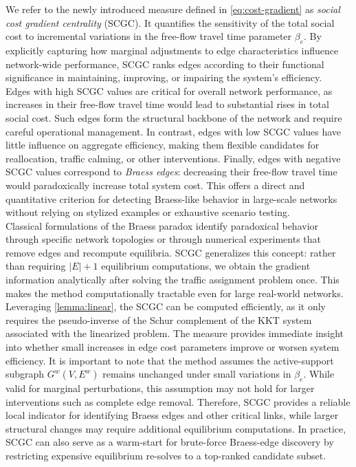 \documentclass[twocolumn,english,groupedaddress, superscriptaddress,aps,pre,10pt,floatfix]{revtex4-2}
\begin{document}
We refer to the newly introduced measure defined in \cref{eq:cost-gradient} as \textit{social cost gradient centrality} (SCGC). It quantifies the sensitivity of the total social cost to incremental variations in the free-flow travel time parameter $\beta_e$. By explicitly capturing how marginal adjustments to edge characteristics influence network-wide performance, SCGC ranks edges according to their functional significance in maintaining, improving, or impairing the system’s efficiency.\\

Edges with high SCGC values are critical for overall network performance, as increases in their free-flow travel time would lead to substantial rises in total social cost. Such edges form the structural backbone of the network and require careful operational management. In contrast, edges with low SCGC values have little influence on aggregate efficiency, making them flexible candidates for reallocation, traffic calming, or other interventions. Finally, edges with negative SCGC values correspond to \textit{Braess edges}: decreasing their free-flow travel time would paradoxically increase total system cost. This offers a direct and quantitative criterion for detecting Braess-like behavior in large-scale networks without relying on stylized examples or exhaustive scenario testing.\\

Classical formulations of the Braess paradox \cite{braess1968paradoxon} identify paradoxical behavior through specific network topologies or through numerical experiments that remove edges and recompute equilibria. SCGC generalizes this concept: rather than requiring $|E|+1$ equilibrium computations, we obtain the gradient information analytically after solving the traffic assignment problem once. This makes the method computationally tractable even for large real-world networks.\\

Leveraging \cref{lemma:linear}, the SCGC can be computed efficiently, as it only requires the pseudo-inverse of the Schur complement of the KKT system associated with the linearized problem. The measure provides immediate insight into whether small increases in edge cost parameters improve or worsen system efficiency. It is important to note that the method assumes the active-support subgraph $G^w(V,E^w)$ remains unchanged under small variations in $\beta_e$. While valid for marginal perturbations, this assumption may not hold for larger interventions such as complete edge removal. Therefore, SCGC provides a reliable local indicator for identifying Braess edges and other critical links, while larger structural changes may require additional equilibrium computations. In practice, SCGC can also serve as a warm-start for brute-force Braess-edge discovery by restricting expensive equilibrium re-solves to a top-ranked candidate subset.
\end{document}

